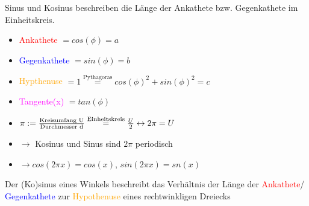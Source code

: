 \begin{definition}[Einheitskreis]
Sinus und Kosinus beschreiben die Länge der Ankathete bzw. Gegenkathete im Einheitskreis.

\begin{multicols}{2}
	\begin{itemize}[label={}, noitemsep]
		\item \textcolor{red}{Ankathete} $= cos(\phi) = a$
		\item \textcolor{blue}{Gegenkathete} $= sin(\phi) = b$
		\item \textcolor{orange}{Hypthenuse} $= 1 \overset{\text{Pythagoras}}{=} cos(\phi)^2 + sin(\phi)^2 = c$	
		\item \textcolor{magenta}{Tangente(x)} $= tan(\phi)$			
		\item $\pi := \frac{\textnormal{Kreisumfang U}}{\textnormal{Durchmesser d}} \overset{\text{Einheitskreis}}{=} \frac{U}{2} \leftrightarrow 2 \pi = U $
		\item $\rightarrow$ Kosinus und Sinus sind $2 \pi$ periodisch
		\item $\rightarrow cos(2 \pi x) = cos(x)$, $sin(2 \pi x) = sn(x)$
	\end{itemize}
\end{multicols}
\end{definition}

\begin{definition}
	Der (Ko)sinus eines Winkels beschreibt das Verhältnis der Länge der \textcolor{red}{Ankathete}/ \textcolor{blue}{Gegenkathete} zur \textcolor{orange}{Hypothenuse} eines rechtwinkligen Dreiecks
\end{definition}


